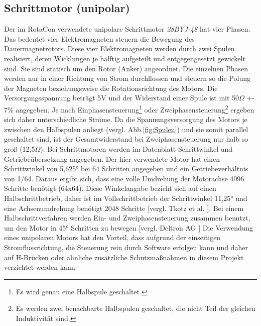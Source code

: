 \documentclass[11pt, titlepage]{report}
\begin{document}
			\subsection*{Schrittmotor (unipolar)}
			\label{sec:Motor}
				Der im RotaCon verwendete unipolare Schrittmotor \textit{28BYJ-48} hat vier Phasen. Das bedeutet vier Elektromagneten steuern die Bewegung des Dauermagnetrotors. Diese vier Elektromagneten werden durch zwei Spulen realisiert, deren Wicklungen je hälftig aufgeteilt und entgegengesetzt gewickelt sind. Sie sind statisch um den Rotor (Anker) angeordnet. Die einzelnen Phasen werden nur in einer Richtung von Strom durchflossen und steuern so die Polung der Magneten beziehungsweise die Rotationsrichtung des Motors. 
				\newline Die Versorgungsspannung beträgt 5V und der Widerstand einer Spule ist mit 50$\Omega$ +- 7\% angegeben. Je nach Einphasensteuerung\footnote{Es wird genau eine Halbspule geschaltet.} oder Zweiphasensteuerung\footnote{Es werden zwei benachbarte Halbspulen geschaltet, die nicht Teil der gleichen Induktivität sind.} ergeben sich daher unterschiedliche Ströme. Da die Spannungsversorgung des Motors je zwischen den Halbspulen anliegt (vergl. Abb.\ref{fig:Spulen}) und sie somit parallel geschaltet sind, ist der Gesamtwiderstand bei Zweiphasensteuerung nur halb so groß (12,5$\Omega$). 
				\newline Bei Schrittmotoren werden im Datenblatt Schrittwinkel und Getriebeübersetzung angegeben. Der hier verwendete Motor hat einen Schrittwinkel von 5,625° bei 64 Schritten angegeben und ein Getriebeverhältnis von 1/64. Daraus ergibt sich, dass eine volle Umdrehung der Motorachse 4096 Schritte benötigt (64x64). Diese Winkelangabe bezieht sich auf einen Halbschrittbetrieb, daher ist im Vollschrittbetrieb der Schrittwinkel 11,25° und eine Achsenumdrehung benötigt 2048 Schritte [vergl. Tkotz et al. \cite[S.641]{Winkelberechnung}]. Bei einem Halbschrittverfahren werden Ein- und Zweiphasensteuerung zusammen benutzt, um den Motor in 45° Schritten zu bewegen [vergl. Deltron AG \cite[S.7]{Schrittmotor_Steuerung}] 
				\newline Die Verwendung eines unipolaren Motors hat den Vorteil, dass aufgrund der einseitigen Stromflussrichtung, die Steuerung rein durch Software erfolgen kann und daher auf H-Brücken oder ähnliche zusätzliche Schutzmaßnahmen in diesem Projekt verzichtet werden kann.
\end{document}

